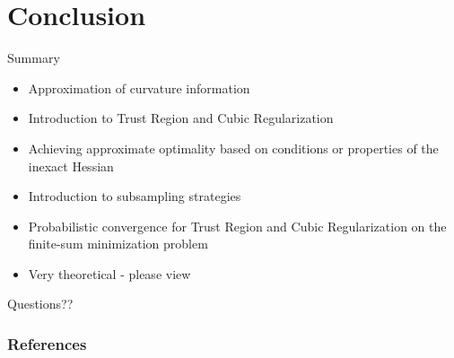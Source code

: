 \documentclass[10pt]{beamer}
\begin{document}
\section{Conclusion}
\begin{frame}{Summary}
\begin{itemize}
\item<1->{Approximation of curvature information}
\item<2->{Introduction to Trust Region and Cubic Regularization}
\item<3->{Achieving approximate optimality based on conditions or properties of the inexact Hessian}
\item<4->{Introduction to subsampling strategies}
\item<5->{Probabilistic convergence for Trust Region and Cubic Regularization on the finite-sum minimization problem}
\item<6->{Very theoretical - please view \href{arxiv.org/abs/1708.07827}{}}
\end{itemize}
\end{frame}

\begin{frame}{Questions??}
\end{frame}

\begin{frame}[t,allowframebreaks]
\frametitle{References}


\end{frame}
\end{document}
